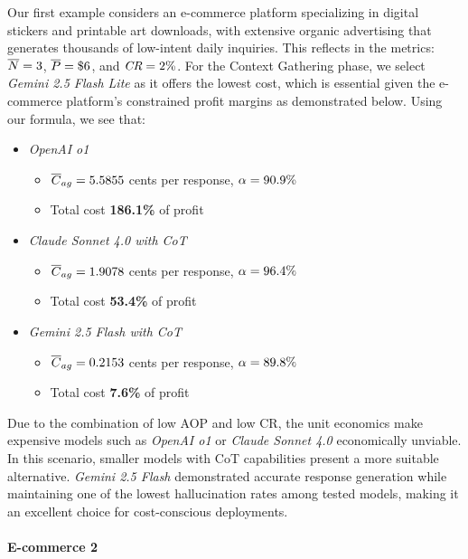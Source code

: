 Our first example considers an e-commerce platform specializing in digital stickers and printable art downloads, with extensive organic advertising that generates thousands of low-intent daily inquiries.
This reflects in the metrics: $\overline{N} = 3$, $\overline{P} = \$6$, and $\textit{CR} = 2\%$.
For the Context Gathering phase, we select \textit{Gemini 2.5 Flash Lite} as it offers the lowest cost, which is essential given the e-commerce platform's constrained profit margins as demonstrated below.
Using our formula, we see that:
\begin{itemize}
    \item \textit{OpenAI o1}
          \begin{itemize}
              \item $\overline{C}_{ag} = 5.5855$ cents per response, $\alpha = 90.9\%$
              \item Total cost \textbf{186.1\%} of profit
          \end{itemize}
    \item \textit{Claude Sonnet 4.0 with CoT}
          \begin{itemize}
              \item $\overline{C}_{ag} = 1.9078$ cents per response, $\alpha = 96.4\%$
              \item Total cost \textbf{53.4\%} of profit
          \end{itemize}
    \item \textit{Gemini 2.5 Flash with CoT}
          \begin{itemize}
              \item $\overline{C}_{ag} = 0.2153$ cents per response, $\alpha = 89.8\%$
              \item Total cost \textbf{7.6\%} of profit
          \end{itemize}
\end{itemize}
Due to the combination of low AOP and low CR, the unit economics make expensive models such as \textit{OpenAI o1} or \textit{Claude Sonnet 4.0} economically unviable.
In this scenario, smaller models with CoT capabilities present a more suitable alternative. \textit{Gemini 2.5 Flash} demonstrated accurate response generation while maintaining one of the lowest hallucination rates among tested models, making it an excellent choice for cost-conscious deployments.

\paragraph*{E-commerce 2}

